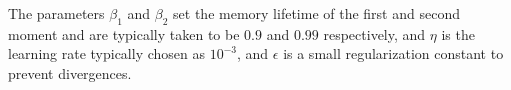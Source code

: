 \documentclass[english,notitlepage,reprint,nofootinbib]{revtex4-2}  %
\begin{document}
The parameters $\beta_1$ and $\beta_2$ set the memory lifetime of the first and second moment and are typically taken to be $0.9$ and $0.99$ respectively, and $\eta$ is the learning rate typically chosen as $10^{-3}$, and $\epsilon$ is a small regularization constant to prevent divergences. 












\onecolumngrid
%
\end{document}
